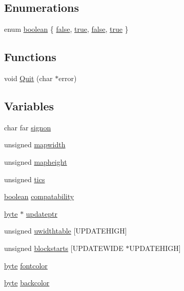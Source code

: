 \subsection*{Enumerations}
\begin{DoxyCompactItemize}
\item 
enum \hyperlink{ID__HEADS_8H_a7c6368b321bd9acd0149b030bb8275ed}{boolean} \{ \hyperlink{ID__HEAD_8H_a7c6368b321bd9acd0149b030bb8275edae9de385ef6fe9bf3360d1038396b884c}{false}, 
\hyperlink{ID__HEAD_8H_a7c6368b321bd9acd0149b030bb8275eda08f175a5505a10b9ed657defeb050e4b}{true}, 
\hyperlink{ID__HEADS_8H_a7c6368b321bd9acd0149b030bb8275edae9de385ef6fe9bf3360d1038396b884c}{false}, 
\hyperlink{ID__HEADS_8H_a7c6368b321bd9acd0149b030bb8275eda08f175a5505a10b9ed657defeb050e4b}{true}
 \}
\end{DoxyCompactItemize}
\subsection*{Functions}
\begin{DoxyCompactItemize}
\item 
void \hyperlink{ID__HEADS_8H_a66ba47a93e3e25204f4d72aee7614201}{Quit} (char $\ast$error)
\end{DoxyCompactItemize}
\subsection*{Variables}
\begin{DoxyCompactItemize}
\item 
char far \hyperlink{ID__HEADS_8H_a22560db608c8ce9c9c0275585bf34980}{signon}
\item 
unsigned \hyperlink{ID__HEADS_8H_a18042bb0860852b7365837e7fb7366c1}{mapwidth}
\item 
unsigned \hyperlink{ID__HEADS_8H_aa57a71a17124e3d1995584f7b4fe1ca0}{mapheight}
\item 
unsigned \hyperlink{ID__HEADS_8H_a2b5fccfe4a509a1a5f685bb7b7399997}{tics}
\item 
\hyperlink{ID__HEAD_8H_a7c6368b321bd9acd0149b030bb8275ed}{boolean} \hyperlink{ID__HEADS_8H_ac82e52209129dcc9cad9d8c8d6b2a77a}{compatability}
\item 
\hyperlink{ID__HEAD_8H_a0c8186d9b9b7880309c27230bbb5e69d}{byte} $\ast$ \hyperlink{ID__HEADS_8H_a120692504a35218a45eabb70ed0e4fe7}{updateptr}
\item 
unsigned \hyperlink{ID__HEADS_8H_af6ce3eaaf641bdbacc8cd7e98eaa90b9}{uwidthtable} \mbox{[}UPDATEHIGH\mbox{]}
\item 
unsigned \hyperlink{ID__HEADS_8H_a55e89f395ced8a12eba2634336292526}{blockstarts} \mbox{[}UPDATEWIDE $\ast$UPDATEHIGH\mbox{]}
\item 
\hyperlink{ID__HEAD_8H_a0c8186d9b9b7880309c27230bbb5e69d}{byte} \hyperlink{ID__HEADS_8H_a37dfad01117cac8636922fd4d030131b}{fontcolor}
\item 
\hyperlink{ID__HEAD_8H_a0c8186d9b9b7880309c27230bbb5e69d}{byte} \hyperlink{ID__HEADS_8H_ae05eaca54ea12a430673a8732425a748}{backcolor}
\end{DoxyCompactItemize}


